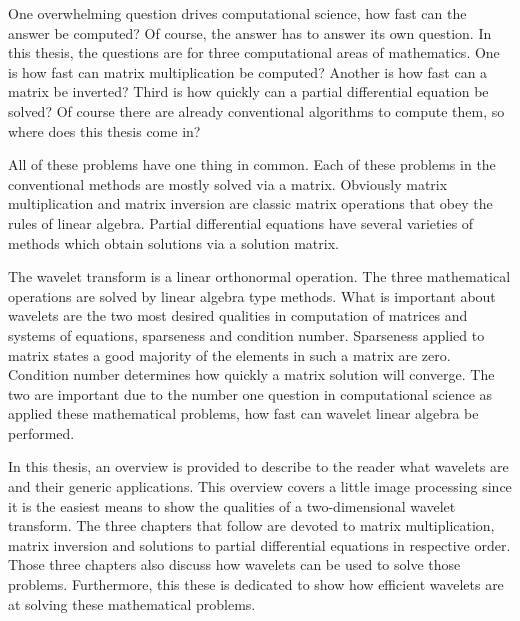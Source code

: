 One overwhelming question drives computational science, how fast can the answer be computed?  Of course, the answer has to answer its own question.  In this thesis, the questions are for three computational areas of mathematics.  One is how fast can matrix multiplication be computed? Another is how fast can a matrix be inverted?  Third is how quickly can a partial differential equation be solved?  Of course there are already conventional algorithms to compute them, so where does this thesis come in?

All of these problems have one thing in common.  Each of these problems in the conventional methods are mostly solved via a matrix.  Obviously matrix multiplication and matrix inversion are classic matrix operations that obey the rules of linear algebra.  Partial differential equations have several varieties of methods which obtain solutions via a solution matrix.  

The wavelet transform is a linear orthonormal operation.   The three mathematical operations are solved by linear algebra type methods.   What is important about wavelets are the two most desired qualities in computation of matrices and systems of equations,  sparseness and condition number.  
Sparseness applied to matrix states a good majority of the elements in such a matrix are zero.   Condition number determines how quickly a matrix solution will converge.  The two are important due to the number one question in computational science as applied these mathematical problems, how fast can wavelet linear algebra be performed.  

In this thesis, an overview is provided to describe to the reader what wavelets are and their generic applications.  This overview covers a little image processing since it is the easiest means to show the qualities of a two-dimensional wavelet transform.  The three chapters that follow are devoted to matrix multiplication, matrix inversion and solutions to partial differential equations in respective order.  Those three chapters also discuss how wavelets can be used to solve those problems.  Furthermore, this these is dedicated to show how efficient wavelets are at solving these mathematical problems.  




